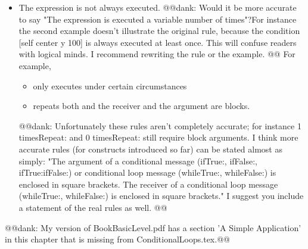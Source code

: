 {{{\begin{itemize}
\begin{itemize}
\item {} repeats  the 
   prints the number to the transcript. 
@@dank: I suggest avoiding examples that use unfamiliar concepts or constructs, other than the one it is designed to illustrate.  The previous example includes an interval, do:, and a block argument, which haven't been introduced in this book.  I recommend substituting an example which uses only familiar constructs.@@
\end{itemize}

\item The expression  is not always executed. 
@@dank: Would it be more accurate to say "The expression is executed a variable number of times"?For instance the second example doesn't illustrate the original rule, because the condition [self center y \replace{>}{>=} 100] is always executed at least once. This will confuse readers with logical minds.  I recommend rewriting the rule or the example. @@
For example,

\begin{itemize} 
\item {} only executes  under certain circumstances 
 
\item {} repeats  both  and  the receiver and the argument are blocks.
\end{itemize}
@@dank: Unfortunately these rules aren't completely accurate; for instance 1 timesRepeat: and 0 timesRepeat: still require block arguments.  I think more accurate rules (for constructs introduced so far) can be stated almost as simply: "The argument of a conditional message (ifTrue:, ifFalse:, ifTrue:ifFalse:) or conditional loop message (whileTrue:, whileFalse:) is enclosed in square brackets. The receiver of a conditional loop message (whileTrue:, whileFalse:) is enclosed in square brackets."  I suggest you include a statement of the real rules as well. @@
\end{itemize}

@@dank: My version of BookBasicLevel.pdf has a section 'A Simple Application' in this chapter that is missing from ConditionalLoops.tex.@@

}}}
